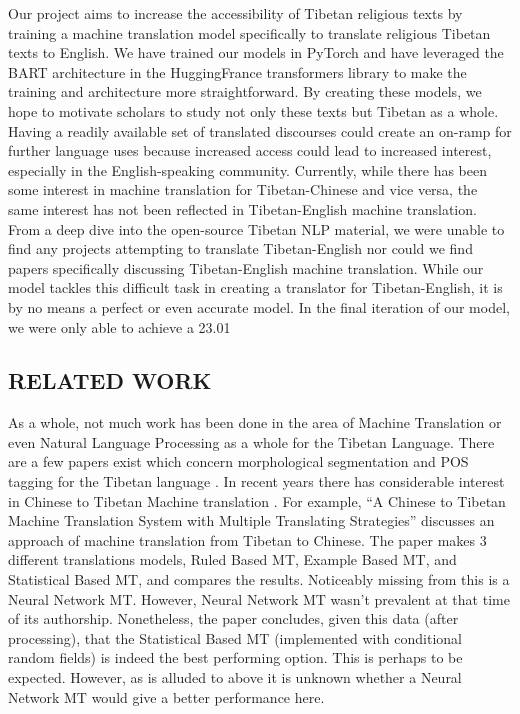 \documentclass[letterpaper, 12 pt, conference]{ieeeconf}  %
\begin{document}
Our project aims to increase the accessibility of Tibetan religious texts by training a machine translation model specifically to translate religious Tibetan texts to English. We have trained our models in PyTorch and have leveraged the BART architecture in the HuggingFrance transformers library to make the training and architecture more straightforward. By creating these models, we hope to motivate scholars to study not only these texts but Tibetan as a whole. Having a readily available set of translated discourses could create an on-ramp for further language uses because increased access could lead to increased interest, especially in the English-speaking community. 
Currently, while there has been some interest in machine translation for Tibetan-Chinese and vice versa, the same interest has not been reflected in Tibetan-English machine translation. From a deep dive into the open-source Tibetan NLP material, we were unable to find any projects attempting to translate Tibetan-English nor could we find papers specifically discussing Tibetan-English machine translation. While our model tackles this difficult task in creating a translator for Tibetan-English, it is by no means a perfect or even accurate model. In the final iteration of our model, we were only able to achieve a 23.01%


\subsection{RELATED WORK}

As a whole, not much work has been done in the area of Machine Translation or even Natural Language Processing as a whole for the Tibetan Language. There are a few papers exist which concern morphological segmentation and POS tagging for the Tibetan language \cite{c3} \cite{c4}. In recent years there has considerable interest in Chinese to Tibetan Machine translation \cite{c1} \cite{c2}. For example, “A Chinese to Tibetan Machine Translation System with Multiple Translating Strategies” discusses an approach of machine translation from Tibetan to Chinese. The paper makes 3 different translations models, Ruled Based MT, Example Based MT, and Statistical Based MT,  and compares the results. Noticeably missing from this is a Neural Network MT. However, Neural Network MT wasn’t prevalent at that time of its authorship. Nonetheless, the paper concludes, given this data (after processing), that the Statistical Based MT (implemented with conditional random fields) is indeed the best performing option. This is perhaps to be expected. However, as is alluded to above it is unknown whether a Neural Network MT would give a better performance here.
\end{document}
